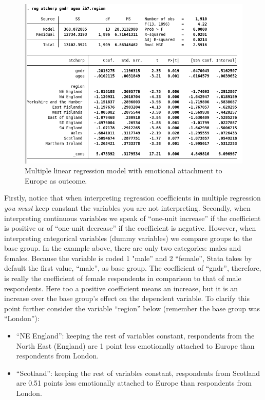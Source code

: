 \begin{figure}[H]
	\includegraphics[width=\linewidth]{./img/mult_reg2.png}
	\caption{Multiple linear regression model with emotional attachment to Europe as outcome.}
\end{figure}

Firstly, notice that when interpreting regression coefficients in multiple regression \textit{you must} keep constant the variables you are not interpreting. Secondly, when interpreting continuous variables we speak of ``one-unit increase'' if the coefficient is positive or of ``one-unit decrease'' if the coefficient is negative. However, when interpreting categorical variables (dummy variables) we compare groups to the base group. In the example above, there are only two categories: males and females. Because the variable is coded 1 "male'' and 2 ``female'', Stata takes by default the first value, ``male'', as base group. The coefficient of ``gndr'', therefore, is really the coefficient of female respondents in comparison to that of male respondents. Here too a positive coefficient means an increase, but it is an increase over the base group's effect on the dependent variable. To clarify this point further consider the variable ``region'' below (remember the base group was ``London''):

\begin{itemize}
	\item ``NE England'': keeping the rest of variables constant, respondents from the North East (England) are 1 point less emotionally attached to Europe than respondents from London.
	\item ``Scotland'': keeping the rest of variables constant, respondents from Scotland are 0.51 points less emotionally attached to Europe than respondents from London.
\end{itemize}

